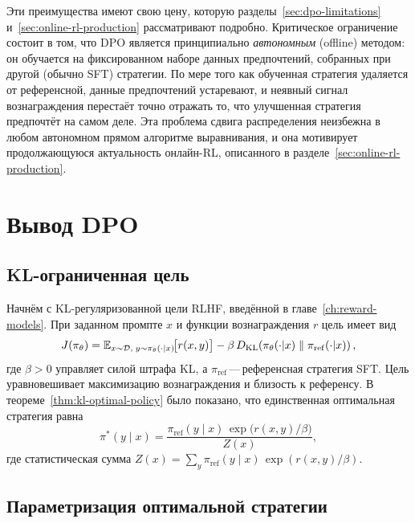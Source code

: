 Эти преимущества имеют свою цену, которую разделы~\ref{sec:dpo-limitations} и~\ref{sec:online-rl-production} рассматривают подробно. Критическое ограничение состоит в том, что DPO является принципиально \emph{автономным} (offline) методом: он обучается на фиксированном наборе данных предпочтений, собранных при другой (обычно SFT) стратегии. По мере того как обученная стратегия удаляется от референсной, данные предпочтений устаревают, и неявный сигнал вознаграждения перестаёт точно отражать то, что улучшенная стратегия предпочтёт на самом деле. Эта проблема сдвига распределения неизбежна в любом автономном прямом алгоритме выравнивания, и она мотивирует продолжающуюся актуальность онлайн-RL, описанного в разделе~\ref{sec:online-rl-production}.

\section{Вывод DPO}
\label{sec:dpo-derivation}

\subsection{KL-ограниченная цель}

Начнём с KL-регуляризованной цели RLHF, введённой в главе~\ref{ch:reward-models}. При заданном промпте $x$ и функции вознаграждения $r$ цель имеет вид
\begin{equation}
\label{eq:dpo-rlhf-obj}
J(\pi_\theta) = \operatorname{\mathbb{E}}_{x \sim \mathcal{D},\; y \sim \pi_\theta(\cdot|x)}\!\bigl[r(x, y)\bigr]
- \beta\,D_{\mathrm{KL}}\!\left(\pi_\theta(\cdot|x)\;\|\;\pi_\mathrm{ref}(\cdot|x)\right),
\end{equation}
где $\beta > 0$ управляет силой штрафа KL, а $\pi_\mathrm{ref}$\,---\,референсная стратегия SFT. Цель уравновешивает максимизацию вознаграждения и близость к референсу. В теореме~\ref{thm:kl-optimal-policy} было показано, что единственная оптимальная стратегия равна
\begin{equation}
\label{eq:dpo-optimal-policy}
\pi^*(y \mid x) = \frac{\pi_\mathrm{ref}(y \mid x)\,\exp\!\bigl(r(x, y)/\beta\bigr)}{Z(x)},
\end{equation}
где статистическая сумма $Z(x) = \sum_y \pi_\mathrm{ref}(y \mid x)\,\exp(r(x, y)/\beta)$.

\subsection{Параметризация оптимальной стратегии}

